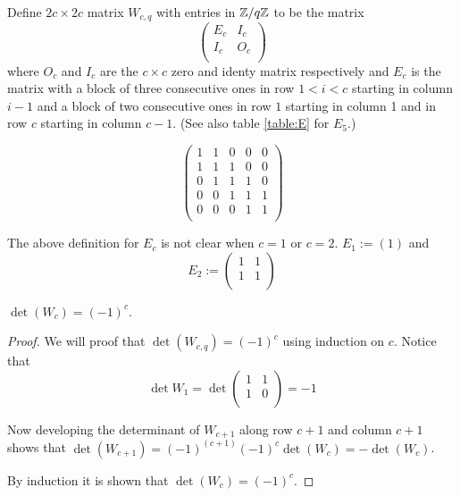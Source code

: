 \begin{definition}
	Define $2c \times 2c$ matrix $W_{c,q}$ with entries in $\mathbb{Z}/q\mathbb{Z}$ to be
	the matrix
	\[
		\left(
		\begin{array}{cc}
			E_{c} & I_{c} \\
			I_{c} & O_{c} \\			
		\end{array}
		\right)
	\]
	where $O_{c}$ and $I_{c}$ are the $c \times c$ zero and identy matrix
	respectively and $E_{c}$ is the matrix with a block of three
	consecutive ones in row $1 < i < c$ starting in column $i-1$ and a block
	of two consecutive ones in row $1$ starting in column 1 and in row $c$
	starting in column $c-1$. (See also table \ref{table:E} for $E_{5}$.)
	\begin{table}
		\[
		\left(
		\begin{array}{ccccc}
			1 & 1 & 0 & 0 & 0 \\
			1 & 1 & 1 & 0 & 0 \\
			0 & 1 & 1 & 1 & 0 \\
			0 & 0 & 1 & 1 & 1 \\
			0 & 0 & 0 & 1 & 1 \\
		\end{array}
		\right)
		\]
		\caption{$E_{5}$}\label{table:E}
	\end{table}
	
	The above definition for $E_{c}$ is not clear when $c=1$ or $c=2$.
	$E_{1} := \left(1\right)$ and
	\[
		E_{2} := \left(
		\begin{array}{cc}
			1 & 1 \\
			1 & 1 \\
		\end{array}
		\right)		
	\]
\end{definition}

\begin{lemma}
	$\det(W_{c}) = (-1)^{c}$.
\end{lemma}

\begin{proof}
	We will proof that $\det(W_{c,q}) = (-1)^c$ using induction on $c$.
	Notice that
	\[
		\det W_{1} = \det \left(
		\begin{array}{cc}
			1 & 1 \\
			1 & 0 \\
		\end{array}
		\right) = -1
	\]
	
	Now developing the determinant of $W_{c+1}$ along row $c+1$ and
	column $c+1$ shows that	$\det(W_{c+1}) = (-1)^{(c+1)}(-1)^{c}
	\det(W_{c}) = -\det(W_{c})$.
	
	By induction it is shown that $\det(W_{c}) = (-1)^{c}$.
\end{proof}

